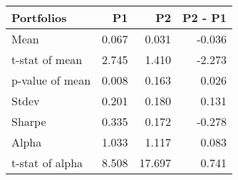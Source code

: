\begin{tabular}{lrrr}
\toprule
Portfolios & P1 & P2 & P2 - P1 \\
\midrule
Mean & 0.067 & 0.031 & -0.036 \\
t-stat of mean & 2.745 & 1.410 & -2.273 \\
p-value of mean & 0.008 & 0.163 & 0.026 \\
Stdev & 0.201 & 0.180 & 0.131 \\
Sharpe & 0.335 & 0.172 & -0.278 \\
Alpha & 1.033 & 1.117 & 0.083 \\
t-stat of alpha & 8.508 & 17.697 & 0.741 \\
\bottomrule
\end{tabular}
